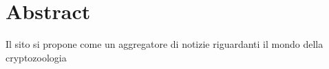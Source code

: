 \section{Abstract}
\label{sec:abstract}

Il sito si propone come un aggregatore di notizie riguardanti il mondo della cryptozoologia
